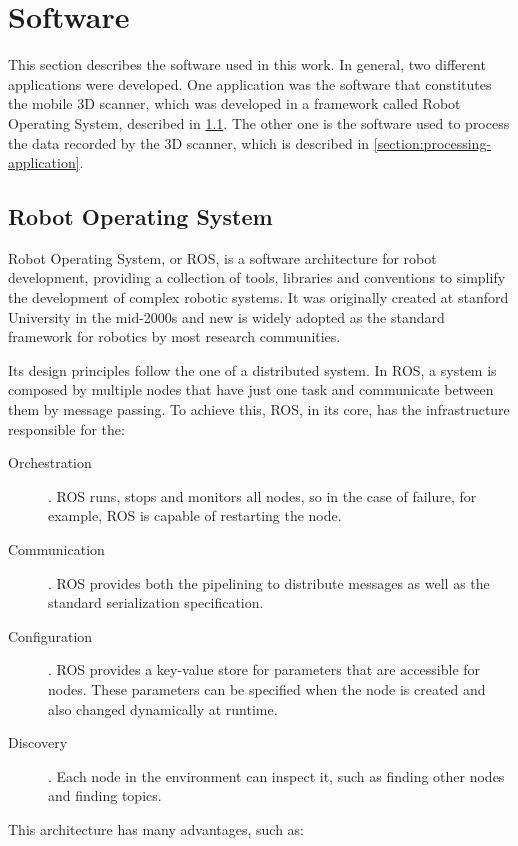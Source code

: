 \section{Software}
\label{section:software}

This section describes the software used in this work. In general, two different applications were developed. One application was the software that constitutes the mobile 3D scanner, which was developed in a framework called Robot Operating System, described in \cref{section:ros}. The other one is the software used to process the data recorded by the 3D scanner, which is described in \cref{section:processing-application}.

\subsection{Robot Operating System}
\label{section:ros}

Robot Operating System, or ROS, is a software architecture for robot development, providing a collection of tools, libraries and conventions to simplify the development of complex robotic systems. It was originally created at stanford University in the mid-2000s and new is widely adopted as the standard framework for robotics by most research communities.

Its design principles follow the one of a distributed system. In ROS, a system is composed by multiple nodes that have just one task and communicate between them by message passing. To achieve this, ROS, in its core, has the infrastructure responsible for the:

\begin{description}
    \item[Orchestration]. ROS runs, stops and monitors all nodes, so in the case of failure, for example, ROS is capable of restarting the node.
    \item[Communication]. ROS provides both the pipelining to distribute messages as well as the standard serialization specification.
    \item[Configuration]. ROS provides a key-value store for parameters that are accessible for nodes. These parameters can be specified when the node is created and also changed dynamically at runtime.
    \item[Discovery]. Each node in the environment can inspect it, such as finding other nodes and finding topics.
\end{description}

This architecture has many advantages, such as:


